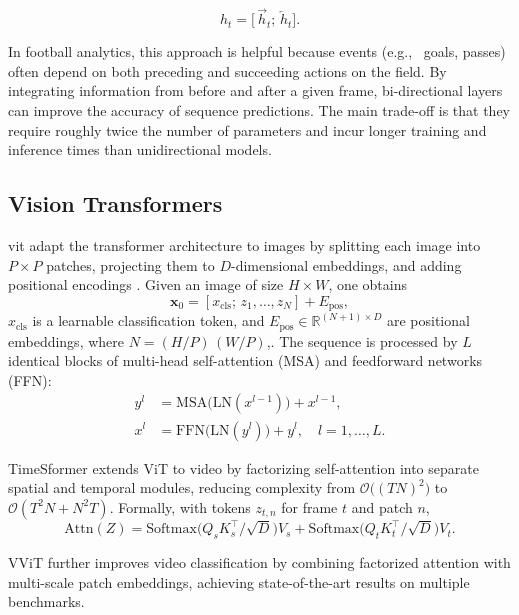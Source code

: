 \[
h_t = \bigl[\,\overrightarrow{h}_t;\,\overleftarrow{h}_t\bigr].
\]

In football analytics, this approach is helpful because events (e.g., \ goals, passes) often depend on both preceding and succeeding actions on the field. By integrating information from before and after a given frame, bi-directional layers can improve the accuracy of sequence predictions. The main trade-off is that they require roughly twice the number of parameters and incur longer training and inference times than unidirectional models.


\subsection{Vision Transformers}
\label{ssec:vision_transformers}

\acrfull{vit} adapt the transformer architecture \cite{vaswani_attention_2017}  to images by splitting each image into $P\times P$ patches, projecting them to $D$-dimensional embeddings, and adding positional encodings \cite{dosovitskiy_image_transformer_2021}. Given an image of size $H\times W$, one obtains
\[
\mathbf{x}_0 = [x_{\text{cls}};\,z_1,\dots,z_N] + E_{\text{pos}},
\]
$x_{\text{cls}}$ is a learnable classification token, and $E_{\text{pos}}\in\mathbb{R}^{(N+1)\times D}$ are positional embeddings, where $N=(H/P)\,(W/P)$,. The sequence is processed by $L$ identical blocks of multi-head self-attention (MSA) and feedforward networks (FFN)\cite{dosovitskiy_image_transformer_2021}:
\begin{align*}
y^l &= \mathrm{MSA}\bigl(\mathrm{LN}(x^{l-1})\bigr) + x^{l-1},\\
x^l &= \mathrm{FFN}\bigl(\mathrm{LN}(y^l)\bigr) + y^l,\quad l=1,\dots,L.
\end{align*}

TimeSformer \cite{bertasius_timesformer_2021} extends ViT to video by factorizing self-attention into separate spatial and temporal modules, reducing complexity from $\mathcal{O}\bigl((TN)^2\bigr)$ to $\mathcal{O}(T^2N + N^2T)$. Formally, with tokens $z_{t,n}$ for frame $t$ and patch $n$,
\[
\mathrm{Attn}(Z)
= \mathrm{Softmax}\!\bigl(Q_sK_s^\top/\sqrt{D}\bigr)V_s
+ \mathrm{Softmax}\!\bigl(Q_tK_t^\top/\sqrt{D}\bigr)V_t.
\]

VViT \cite{arnab_vvit_2021} further improves video classification by combining factorized attention with multi-scale patch embeddings, achieving state-of-the-art results on multiple benchmarks.


